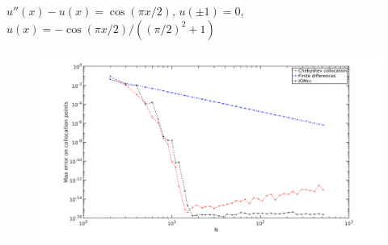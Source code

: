 \documentclass{beamer}
\begin{document}

\begin{frame}
$u''(x) - u(x) = \cos(\pi x / 2)$, $u(\pm 1) = 0$, $u(x) = -\cos(\pi x/2) / ( (\pi/2)^2 + 1)$
\begin{figure}
\includegraphics[width=\textwidth]{example_seminar2.png}
\end{figure}
\end{frame}
\end{document}
